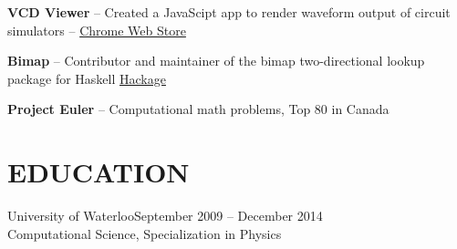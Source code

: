 \documentclass{res}
\begin{document}
\begin{resume}
    {\bf VCD Viewer} -- Created a JavaScipt app to render waveform output of circuit simulators --
    \href{https://chrome.google.com/webstore/detail/vcd-viewer/fpacodjpmmabkjooobgbpgpmgbfjidkg?hl=en-US}{Chrome Web Store}
    \vspace{-3mm}

    {\bf Bimap} -- Contributor and maintainer of the bimap two-directional lookup package for Haskell
    \href{http://hackage.haskell.org/package/bimap-0.3.0}{Hackage}
    \vspace{-3mm}

    {\bf Project Euler} -- Computational math problems, Top 80 in Canada

\section{EDUCATION}
  \vspace{3mm}
    University of Waterloo\hfill September 2009 -- December 2014\\
    Computational Science, Specialization in Physics
    \vspace{-3mm}
 
\end{resume}
\end{document}
